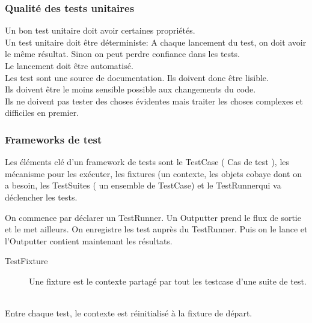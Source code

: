 \subsubsection{Qualité des tests unitaires}
	Un bon test unitaire doit avoir certaines propriétés.
	\\Un test unitaire doit être déterministe: A chaque lancement du test, on doit avoir le même résultat. Sinon on peut perdre confiance dans les tests.
	\\Le lancement doit être automatisé.
	\\Les test sont une source de documentation. Ils doivent donc être lisible.
	\\Ils doivent être le moins sensible possible aux changements du code.
	\\Ils ne doivent pas tester des choses évidentes mais traiter les choses complexes et difficiles en premier.


\subsubsection{Frameworks de test}
	Les éléments clé d’un framework de tests sont le TestCase ( Cas de test ), les mécanisme pour les exécuter, les fixtures (un contexte, les objets cobaye dont on a besoin, les TestSuites ( un ensemble de TestCase) et le TestRunnerqui va déclencher les tests.

	On commence par déclarer un TestRunner. Un Outputter prend le flux de sortie et le met ailleurs. On enregistre les test auprès du TestRunner. Puis on le lance et l’Outputter contient maintenant les résultats.

	\begin{description}
		\item [TestFixture] Une fixture est le contexte partagé par tout les testcase d’une suite de test.
	\end{description}
	\\Entre chaque test, le contexte est réinitialisé à la fixture de départ.